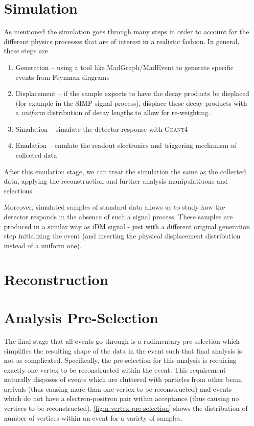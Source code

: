 \section{Simulation} \label{sec:hps:sim}
As mentioned the simulation goes through many steps in order to account for the different physics
processes that are of interest in a realistic fashion. In general, these steps are
\begin{enumerate}
  \item Generation -- using a tool like {\sc MadGraph/MadEvent} to generate
        specific events from Feynman diagrams
  \item Displacement -- if the sample expects to have the decay products be displaced (for example in the
        SIMP signal process), displace these decay products with a \emph{uniform} distribution of decay
        lengths to allow for re-weighting.
  \item Simulation -- simulate the detector response with \textsc{Geant4}\cite{geant4}
  \item Emulation -- emulate the readout electronics and triggering mechanism of collected data
\end{enumerate}
After this emulation stage, we can treat the simulation the same as the collected data,
applying the reconstruction and further analysis manipulatiuons and selections.

Moreover, simulated samples of standard data allows us to study how the detector responds in the
absence of such a signal process. These samples are produced in a similar way as iDM signal - just
with a different original generation step initializing the event (and inserting the physical
displacement distribution instead of a uniform one).

\section{Reconstruction}

\section{Analysis Pre-Selection}
The final stage that all events go through is a rudimentary pre-selection which simplifies the
resulting shape of the data in the event such that final analysis is not as complicated.
Specifically, the pre-selection for this analysis is requiring exactly one vertex to be
reconstructed within the event. This requirement naturally disposes of events which are cluttered
with particles from other beam arrivals (thus causing more than one vertex to be reconstructed) and
events which do not have a electron-positron pair within acceptance (thus causing no vertices to be
reconstructed). \cref{fig:n-vertex-pre-selection} shows the distribution of number of vertices
within an event for a variety of samples.

